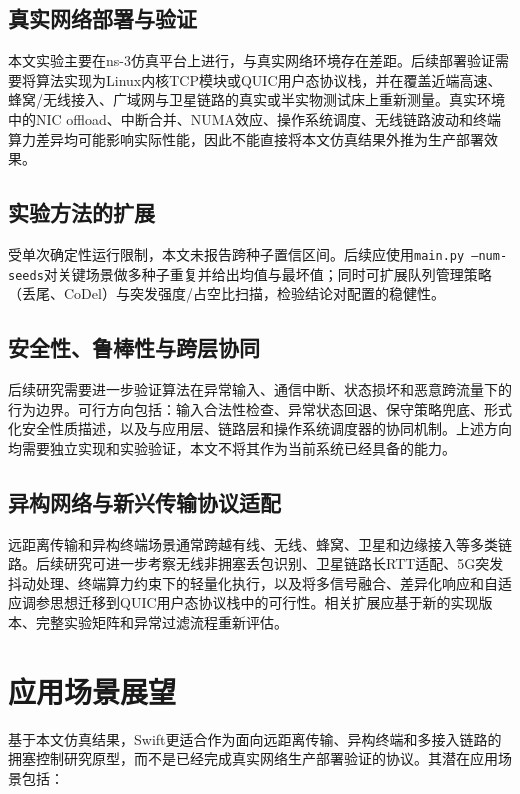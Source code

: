 \subsection{真实网络部署与验证}

本文实验主要在ns-3仿真平台上进行，与真实网络环境存在差距。后续部署验证需要将算法实现为Linux内核TCP模块或QUIC用户态协议栈，并在覆盖近端高速、蜂窝/无线接入、广域网与卫星链路的真实或半实物测试床上重新测量。真实环境中的NIC offload、中断合并、NUMA效应、操作系统调度、无线链路波动和终端算力差异均可能影响实际性能，因此不能直接将本文仿真结果外推为生产部署效果。

\subsection{实验方法的扩展}

受单次确定性运行限制，本文未报告跨种子置信区间。后续应使用\texttt{main.py --num-seeds}对关键场景做多种子重复并给出均值与最坏值；同时可扩展队列管理策略（丢尾、CoDel）与突发强度/占空比扫描，检验结论对配置的稳健性。

\subsection{安全性、鲁棒性与跨层协同}

后续研究需要进一步验证算法在异常输入、通信中断、状态损坏和恶意跨流量下的行为边界。可行方向包括：输入合法性检查、异常状态回退、保守策略兜底、形式化安全性质描述，以及与应用层、链路层和操作系统调度器的协同机制。上述方向均需要独立实现和实验验证，本文不将其作为当前系统已经具备的能力。

\subsection{异构网络与新兴传输协议适配}

远距离传输和异构终端场景通常跨越有线、无线、蜂窝、卫星和边缘接入等多类链路。后续研究可进一步考察无线非拥塞丢包识别、卫星链路长RTT适配、5G突发抖动处理、终端算力约束下的轻量化执行，以及将多信号融合、差异化响应和自适应调参思想迁移到QUIC用户态协议栈中的可行性。相关扩展应基于新的实现版本、完整实验矩阵和异常过滤流程重新评估。

\section{应用场景展望}\label{Sec6.3}

基于本文仿真结果，Swift更适合作为面向远距离传输、异构终端和多接入链路的拥塞控制研究原型，而不是已经完成真实网络生产部署验证的协议。其潜在应用场景包括：

